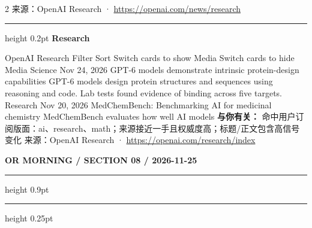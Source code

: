 \documentclass[10.5pt]{ctexart}
\begin{document}
\begin{multicols}{2}
{\footnotesize\color{ormuted} 来源：OpenAI Research · \url{https://openai.com/news/research}}
\vspace{2mm}
\hrule height 0.2pt
\vspace{2mm}
{\large\bfseries Research}\par
OpenAI Research Filter Sort Switch cards to show Media Switch cards to hide Media Science Nov 24, 2026 GPT-6 models demonstrate intrinsic protein-design capabilities GPT-6 models design protein structures and sequences using reasoning and code. Lab tests found evidence of binding across five targets. Research Nov 20, 2026 MedChemBench: Benchmarking AI for medicinal chemistry MedChemBench evaluates how well AI models 
\textbf{与你有关：} 命中用户订阅版面：ai、research、math；来源接近一手且权威度高；标题/正文包含高信号变化
{\footnotesize\color{ormuted} 来源：OpenAI Research · \url{https://openai.com/research/index}}
\end{multicols}
\newpage
{\small\bfseries OR MORNING / SECTION 08 / 2026-11-25}
\vspace{2mm}
\hrule height 0.9pt
\vspace{1.5mm}
\hrule height 0.25pt
\vspace{4mm}
\end{document}
